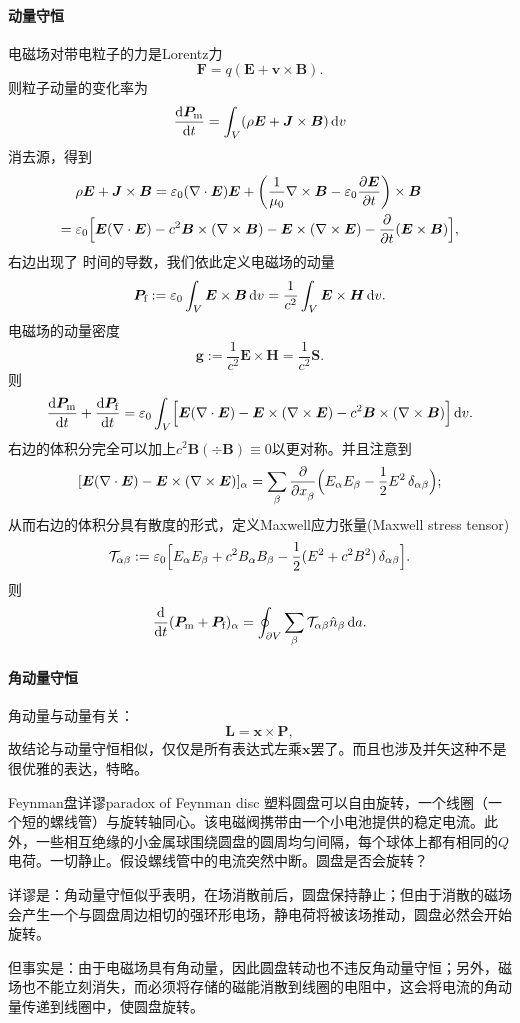 \paragraph{动量守恒}
电磁场对带电粒子的力是Lorentz力
\[
    \bm F=q(\bm E+\bm v\times\bm B).
\]
则粒子动量的变化率为
\[
    \frac{\mathrm{d}^{\;\!\!}\bm P_\text m}{\mathrm{d} t^{\;\!\!}}=\int_V(\rho\bm E+\bm J\times\bm B)\mathop{}\!\mathrm{d} v
\]
消去源，得到
\begin{align*}
    &\rho\bm E+\bm J\times\bm B=\varepsilon_0(\div\bm E)\bm E+\biggkh{\frac1{\mu_0}\curl\bm B-\varepsilon_0\pv{\bm E}t}\times\bm B\\
    ={}&\varepsilon_0\Bigfkh{\bm E(\div\bm E)-c^2\bm B\times(\curl\bm B)-\bm E\times(\curl\bm E)-\pp t(\bm E\times\bm B)},
\end{align*}
右边出现了%
时间的导数，我们依此定义电磁场的动量
\[
    \bm P_\text f:=\varepsilon_0\int_V\bm E\times\bm B\mathop{}\!\mathrm{d} v=\frac1{c^2}\int_V\bm E\times\bm H\mathop{}\!\mathrm{d} v.
\]
电磁场的动量密度
\[
    \bm g:=\frac1{c^2}\bm E\times\bm H=\frac1{c^2}\bm S.
\]
则
\[
    \dv{\bm P_\text m}t+\dv{\bm P_\text f}t=\varepsilon_0\int_V\Bigfkh{\bm E(\div\bm E)-\bm E\times(\curl\bm E)-c^2\bm B\times(\curl\bm B)}\d v.
\]
右边的体积分完全可以加上$c^2\bm B(\div\bm B)\equiv 0$以更对称。并且注意到
\[
    [\bm E(\nabla\cdot\bm E)-\bm E\times(\nabla\times\bm E)]_\alpha=\sum_\beta\frac{\partial^{\;\!\!}}{\partial x_\beta^{\;\!\!}}\Bigl(E_\alpha E_\beta-\frac12E^2\mathop{}\!\delta_{\alpha\beta}\Bigr);
\]
从而右边的体积分具有散度的形式，定义Maxwell应力张量(Maxwell stress tensor)
\[
    \mathcal T_{\alpha\beta}:=\varepsilon_0\Bigl[E_\alpha E_\beta+c^2B_\alpha B_\beta-\frac12(E^2+c^2B^2)\mathop{}\!\delta_{\alpha\beta}\Bigr].
\]
则
\[
    \frac{\mathrm{d}^{\;\!\!}}{\mathrm{d} t^{\;\!\!}}({\bm P_\text m}+{\bm P_\text f})_\alpha=\oint_{\partial V}\sum_\beta\mathcal  T_{\alpha\beta}\hat n_\beta\mathop{}\!\mathrm{d} a.
\]
\paragraph{角动量守恒}
角动量与动量有关：
\[
    \bm L=\bm x\times\bm P,
\]
故结论与动量守恒相似，仅仅是所有表达式左乘$\bm x$罢了。而且也涉及并矢这种不是很优雅的表达，特略。
\begin{example}{Feynman盘详谬}{paradox of Feynman disc}
    塑料圆盘可以自由旋转，一个线圈（一个短的螺线管）与旋转轴同心。该电磁阀携带由一个小电池提供的稳定电流。此外，一些相互绝缘的小金属球围绕圆盘的圆周均匀间隔，每个球体上都有相同的$Q$电荷。一切静止。假设螺线管中的电流突然中断。圆盘是否会旋转？

    详谬是：角动量守恒似乎表明，在场消散前后，圆盘保持静止；但由于消散的磁场会产生一个与圆盘周边相切的强环形电场，静电荷将被该场推动，圆盘必然会开始旋转。

    但事实是：由于电磁场具有角动量，因此圆盘转动也不违反角动量守恒；另外，磁场也不能立刻消失，而必须将存储的磁能消散到线圈的电阻中，这会将电流的角动量传递到线圈中，使圆盘旋转。
\end{example}
